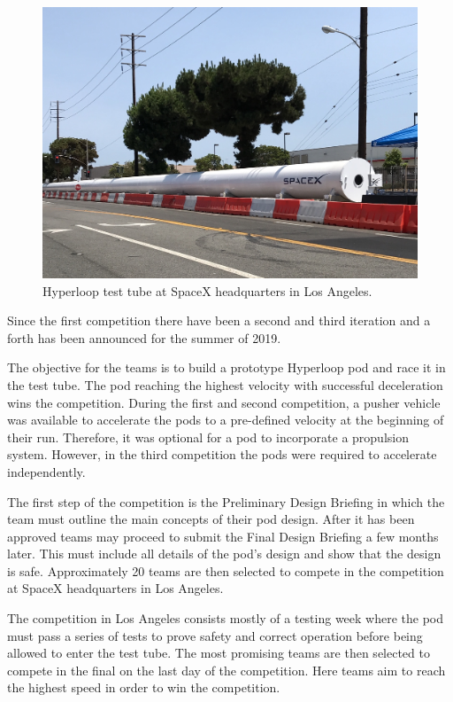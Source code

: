 \begin{figure}[H]
  \centering \includegraphics[width=1.0\textwidth]{./figures/hyperloop_tube}
  \caption{Hyperloop test tube at SpaceX headquarters in Los Angeles.}
\end{figure}

Since the first competition there have been a second and third iteration and a forth has been announced for the summer of 2019.

The objective for the teams is to build a prototype Hyperloop pod and race it in the test tube. The pod reaching the highest velocity with successful deceleration wins the competition. During the first and second competition, a pusher vehicle was available to accelerate the pods to a pre-defined velocity at the beginning of their run. Therefore, it was optional for a pod to incorporate a propulsion system. However, in the third competition the pods were required to accelerate independently.

The first step of the competition is the Preliminary Design Briefing in which the team must outline the main concepts of their pod design. After it has been approved teams may proceed to submit the Final Design Briefing a few months later. This must include all details of the pod's design and show that the design is safe. Approximately 20 teams are then selected to compete in the competition at SpaceX headquarters in Los Angeles.

The competition in Los Angeles consists mostly of a testing week where the pod must pass a series of tests to prove safety and correct operation before being allowed to enter the test tube. The most promising teams are then selected to compete in the final on the last day of the competition. Here teams aim to reach the highest speed in order to win the competition.


